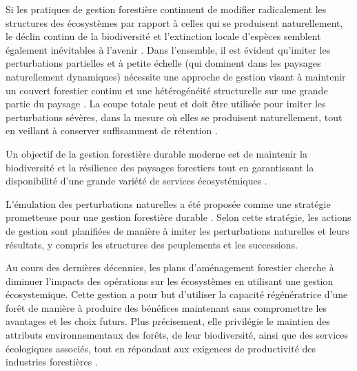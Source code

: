 Si les pratiques de gestion forestière continuent de modifier radicalement les structures des écosystèmes par rapport à celles qui se produisent naturellement, le déclin continu de la biodiversité et l'extinction locale d'espèces semblent également inévitables à l'avenir \citep{Hanski2000Extinctiondebt}.
Dans l'ensemble, il est évident qu'imiter les perturbations partielles et à petite échelle (qui dominent dans les paysages naturellement dynamiques) nécessite une approche de gestion visant à maintenir un couvert forestier continu et une hétérogénéité structurelle sur une grande partie du paysage \citep{Kuuluvainen2009Forestmanagement}. 
La coupe totale peut et doit être utilisée pour imiter les perturbations sévères, dans la mesure où elles se produisent naturellement, tout en veillant à conserver suffisamment de rétention \citep{Kuuluvainen2009Forestmanagement}.

Un objectif de la gestion forestière durable moderne est de maintenir la biodiversité et la résilience des paysages forestiers tout en garantissant la disponibilité d'une grande variété de services écosystémiques \citep{Kuuluvainen2009Forestmanagement}.

L'émulation des perturbations naturelles a été proposée comme une stratégie prometteuse pour une gestion forestière durable \citep{Kuuluvainen2002Naturalvariabilitya}. 
Selon cette stratégie, les actions de gestion sont planifiées de manière à imiter les perturbations naturelles et leurs résultats, y compris les structures des peuplements et les successions. 

Au cours des dernières décennies, les plans d’aménagement forestier cherche à diminuer l'impacts des opérations sur les écosystèmes en utilisant une gestion écosystemique. 
Cette gestion a pour but d'utiliser la capacité régénératrice d'une forêt de manière à produire des bénéfices maintenant sans compromettre les avantages et les choix futurs. 
Plus précisement, elle privilégie le maintien des attributs environnementaux des forêts, de leur biodiversité, ainsi que des services écologiques associés, tout en répondant aux exigences de productivité des industries forestières \citep{Perry1998scientificbasis,Szaro1998emergenceecosystem,Kuuluvainen2009Forestmanagement,MacDicken2015Globalprogress}. 


